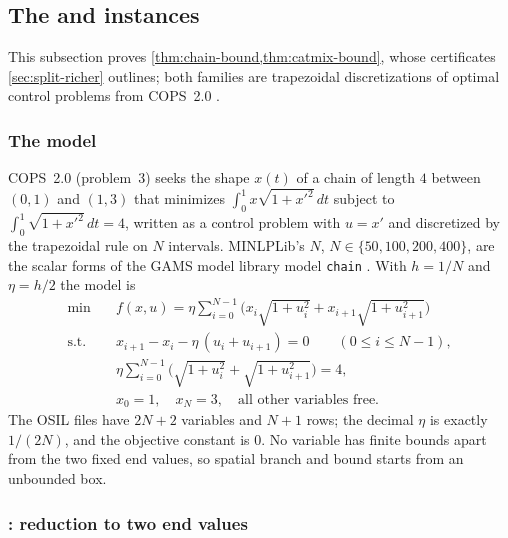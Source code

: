 \subsection{The  and  instances}\label{app:chain}

This subsection proves \cref{thm:chain-bound,thm:catmix-bound}, whose certificates \cref{sec:split-richer} outlines; both families are trapezoidal discretizations of optimal control problems from COPS~2.0 \citep{dolan2001-benchmarking-optimization-software-with-cops}.

\subsubsection{The  model}\label{app:chain-model}

COPS~2.0 (problem~3) seeks the shape $x(t)$ of a chain of length $4$ between $(0,1)$ and $(1,3)$ that minimizes $\int_0^1 x\sqrt{1+x'^2}\,dt$ subject to $\int_0^1 \sqrt{1+x'^2}\,dt = 4$, written as a control problem with $u = x'$ and discretized by the trapezoidal rule on $N$ intervals.
MINLPLib's $N$, $N\in\{50,100,200,400\}$, are the scalar forms of the GAMS model library model \texttt{chain} \citep{library2026-cops-and-gams-source-models}.
With $h = 1/N$ and $\eta = h/2$ the model is
\begin{equation}\label{eq:chain-model}
\begin{aligned}
\min\quad & f(x,u) = \eta \textstyle\sum_{i=0}^{N-1} \bigl( x_i\sqrt{1+u_i^2} + x_{i+1}\sqrt{1+u_{i+1}^2} \bigr)\\
\text{s.t.}\quad & x_{i+1} - x_i - \eta\,(u_i + u_{i+1}) = 0 \qquad (0 \le i \le N-1),\\
& \eta \textstyle\sum_{i=0}^{N-1} \bigl( \sqrt{1+u_i^2} + \sqrt{1+u_{i+1}^2} \bigr) = 4,\\
& x_0 = 1,\quad x_N = 3,\quad \text{all other variables free.}
\end{aligned}
\end{equation}
The OSIL files have $2N+2$ variables and $N+1$ rows; the decimal $\eta$ is exactly $1/(2N)$, and the objective constant is $0$.
No variable has finite bounds apart from the two fixed end values, so spatial branch and bound starts from an unbounded box.

\subsubsection{\texorpdfstring{}{chain}: reduction to two end values}\label{app:chain-reduction}


